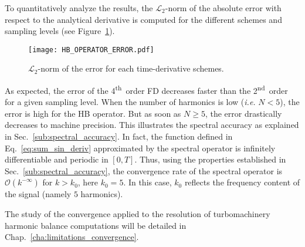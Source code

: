 To quantitatively analyze the results, the 
$\mathcal{L}_2$-norm of the absolute error with respect to the analytical
derivative is computed for the different schemes and 
sampling levels (see Figure~\ref{fig:hb_operator_error}).
\begin{figure}[htp]
  \centering
   \texttt{[image: HB\_OPERATOR\_ERROR.pdf]}
   \caption{$\mathcal{L}_2$-norm of the error for each time-derivative
   schemes.}
  \label{fig:hb_operator_error}
\end{figure}
As expected, the error of the 4\textsuperscript{th}~order FD
decreases faster  than the 2\textsuperscript{nd}~order for a given sampling level.
When the number of harmonics is low 
(\emph{i.e.} $N < 5$), the error is high for the HB operator. 
But as soon as $N \geq 5$, the error
drastically decreases to machine precision.
This illustrates the spectral accuracy as explained in 
Sec.~\ref{sub:spectral_accuracy}. In fact, the function defined
in Eq.~\eqref{eq:sum_sin_deriv} approximated by the spectral operator
is infinitely differentiable and periodic in $[0, T]$.
Thus, using the properties established in Sec.~\ref{sub:spectral_accuracy},
the convergence rate of the spectral operator is $\mathcal{O} (k^{-\infty})$
for $k > k_0$, here $k_0=5$. In this case, $k_0$
reflects the frequency content of the signal (namely $5$ harmonics).

The study of the convergence applied to the resolution
of turbomachinery harmonic balance computations will
be detailed in Chap.~\ref{cha:limitations_convergence}.
